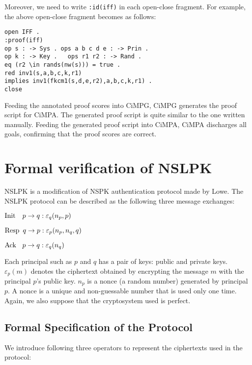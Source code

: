 \documentclass[10pt, conference, compsocconf]{IEEEtran}
\begin{document}
Moreover, we need to write \verb!:id(iff)! in each open-close
fragment. For example, the above open-close fragment becomes as follows:

\begin{small}
	\begin{verbatim}
open IFF .
:proof(iff)
op s : -> Sys . ops a b c d e : -> Prin .
op k : -> Key .   ops r1 r2 : -> Rand .
eq (r2 \in rands(nw(s))) = true .
red inv1(s,a,b,c,k,r1) 
implies inv1(fkcm1(s,d,e,r2),a,b,c,k,r1) .
close
	\end{verbatim}
\end{small}

Feeding the annotated proof scores into CiMPG, CiMPG generates the
proof script for CiMPA. The generated proof script is quite similar to
the one written manually. Feeding the generated proof script into
CiMPA, CiMPA discharges all goals, confirming that the proof scores
are correct. 


\section{Formal verification of NSLPK}
\label{sect_nslpk}
NSLPK \cite{nslpk95} is a modification of NSPK authentication protocol \cite{nspk78} made by Lowe. 
The NSLPK protocol can be described as the following three message exchanges:

${\rm Init} \ \ \ p \rightarrow q : \varepsilon_q(n_p, p)$

${\rm Resp} \ \, q \rightarrow p : \varepsilon_p(n_p, n_q,q)$

${\rm Ack} \ \ \: p \rightarrow q : \varepsilon_q(n_q)$

\noindent
Each principal such as $p$ and $q$ has a pair of keys: public and private keys. $\varepsilon_p(m)$ denotes the ciphertext obtained by encrypting the message $m$ with the principal $p$'s public key. $n_p$ is a nonce (a random number) generated by principal $p$. 
A nonce is a unique and non-guessable number that is used only one time.
Again, we also suppose that the cryptosystem used is perfect.

\subsection{Formal Specification of the Protocol}
We introduce following three operators to represent the ciphertexts used in the protocol:

\end{document}
